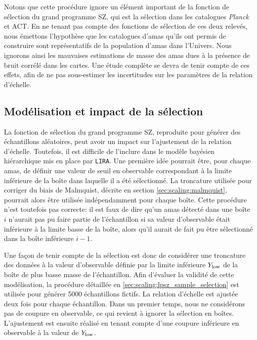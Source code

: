 Notons que cette procédure ignore un élément important de la fonction de sélection du grand programme SZ, qui est la sélection dans les catalogues \textit{Planck} et ACT.
En ne tenant pas compte des fonctions de sélection de ces deux relevés, nous émettons l'hypothèse que les catalogues d'amas qu'ils ont permis de construire sont représentatifs de la population d'amas dans l'Univers.
Nous ignorons ainsi les mauvaises estimations de masse des amas dues à la présence de bruit corrélé dans les cartes.
Une étude complète se devra de tenir compte de ces effets, afin de ne pas sous-estimer les incertitudes sur les paramètres de la relation d'échelle.

\subsection{Modélisation et impact de la sélection}
\label{sec:scaling:intercept_bias}

La fonction de sélection du grand programme SZ, reproduite pour générer des échantillons aléatoires, peut avoir un impact sur l'ajustement de la relation d'échelle.
Toutefois, il est difficile de l'inclure dans le modèle bayésien hiérarchique mis en place par \texttt{LIRA}.
Une première idée pourrait être, pour chaque amas, de définir une valeur de seuil en observable correspondant à la limite inférieure de la boîte dans laquelle il a été sélectionné.
La troncature utilisée pour corriger du biais de Malmquist, décrite en section \ref{sec:scaling:malmquist}, pourrait alors être utilisée indépendamment pour chaque boîte.
Cette procédure n'est toutefois pas correcte: il est faux de dire qu'un amas détecté dans une boîte $i$ n'aurait pas pu faire partie de l'échantillon si sa valeur d'observable était inférieure à la limite basse de la boîte, alors qu'il aurait de fait pu être sélectionné dans la boîte inférieure $i-1$.

Une façon de tenir compte de la sélection est donc de considérer une troncature des données à la valeur d'observable définie par la limite inférieure $Y_{\rm low}$ de la boîte de plus basse masse de l'échantillon.
Afin d'évaluer la validité de cette modélisation, la procédure détaillée en \ref{sec:scaling:lpsz_sample_selection} est utilisée pour générer 5000 échantillons fictifs.
La relation d'échelle est ajustée deux fois pour chaque échantillon.
Dans un premier temps, nous ne considérons pas de coupure en observable, ce qui revient à ignorer la sélection en boîtes.
L'ajustement est ensuite réalisé en tenant compte d'une coupure inférieure en observable à la valeur de $Y_{\rm low}$.

